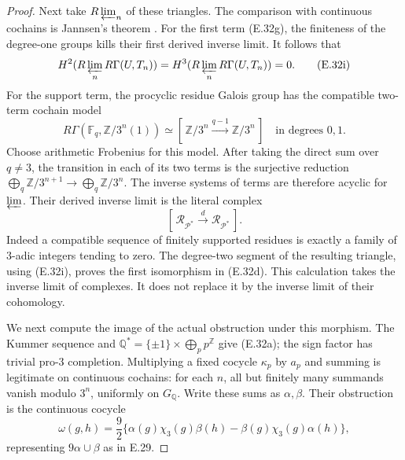 \begin{proof}
Next take $R\varprojlim_n$ of these triangles. The comparison
with continuous cochains is Jannsen's theorem
\cite[(2.2), together with (1.6)]{E_JannsenContinuous}.
For the first term (E.32g), the finiteness of the degree-one
groups kills their first derived inverse limit. It follows that
\[
 H^2(R\varprojlim_nR\Gamma(U,T_n))
 =H^3(R\varprojlim_nR\Gamma(U,T_n))=0.                       \tag{E.32i}
\]
For the support term, the procyclic residue Galois group has
the compatible two-term cochain model
\[
 R\Gamma(\mathbb F_q,\mathbb Z/3^n(1))
  \simeq[\,\mathbb Z/3^n\xrightarrow{q-1}\mathbb Z/3^n\,]
                 \quad\text{in degrees }0,1.                \tag{E.32j}
\]
Choose arithmetic Frobenius for this model. After taking the
direct sum over $q\ne3$, the transition in each of its two
terms is the surjective reduction
$\bigoplus_q\mathbb Z/3^{n+1}\to\bigoplus_q\mathbb Z/3^n$.
The inverse systems of terms are therefore acyclic for
$\varprojlim$. Their derived inverse limit is the literal
complex
\[
 [\,\mathcal R_{\mathcal P^*}
         \xrightarrow{d}\mathcal R_{\mathcal P^*}\,].          \tag{E.32k}
\]
Indeed a compatible sequence of finitely supported residues
is exactly a family of $3$-adic integers tending to zero.
The degree-two segment of the resulting triangle, using
(E.32i), proves the first isomorphism in (E.32d).
This calculation takes the inverse limit of complexes. It
does not replace it by the inverse limit of their cohomology.

We next compute the image of the actual obstruction under
this morphism. The Kummer sequence and
$\mathbb Q^*=\{\pm1\}\times\bigoplus_p p^{\mathbb Z}$
give (E.32a); the sign factor has trivial pro-$3$ completion.
Multiplying a fixed cocycle $\kappa_p$ by $a_p$ and summing
is legitimate on continuous cochains: for each $n$, all but
finitely many summands vanish modulo $3^n$, uniformly on
$G_{\mathbb Q}$. Write these sums as $\alpha,\beta$.
Their obstruction is the continuous cocycle
\[
 \omega(g,h)=\frac92\{
    \alpha(g)\chi_3(g)\beta(h)
       -\beta(g)\chi_3(g)\alpha(h)\},                        \tag{E.32l}
\]
representing $9\alpha\cup\beta$ as in E.29.


\end{proof}
